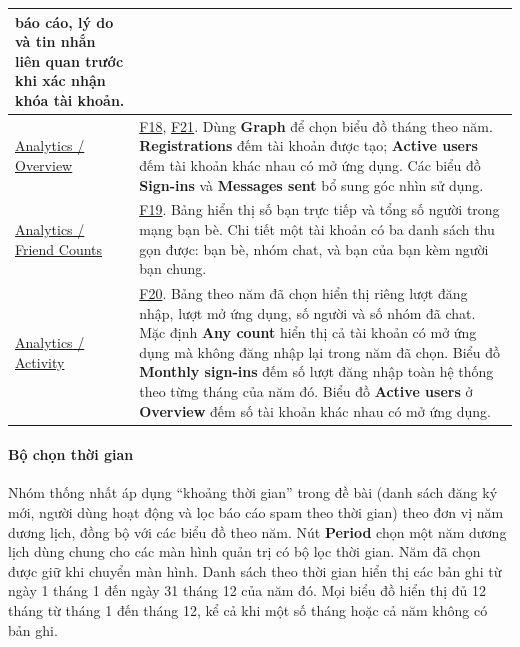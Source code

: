 \begin{longtable}{|L{4.3cm}|L{\dimexpr\textwidth-4.3cm-4\arrayrulewidth\relax}|}
  báo cáo, lý do và tin nhắn liên quan trước khi xác nhận khóa tài khoản.\\
  \hline
  \href{https://www.figma.com/design/maCogjZs9eOOhfkxsOZoIU?node-id=53-934}{Analytics / Overview}
  & \hyperlink{F18}{F18}, \hyperlink{F21}{F21}. Dùng \textbf{Graph} để chọn
  biểu đồ tháng theo năm. \textbf{Registrations} đếm tài khoản được tạo;
  \textbf{Active users} đếm tài khoản khác nhau có mở ứng dụng. Các biểu đồ
  \textbf{Sign-ins} và \textbf{Messages sent} bổ sung góc nhìn sử dụng.\\
  \hline
  \href{https://www.figma.com/design/maCogjZs9eOOhfkxsOZoIU?node-id=53-1087}{Analytics / Friend Counts}
  & \hyperlink{F19}{F19}. Bảng hiển thị số bạn trực tiếp và tổng số người
  trong mạng bạn bè. Chi tiết một tài khoản có ba danh sách thu gọn được:
  bạn bè, nhóm chat, và bạn của bạn kèm người bạn chung.\\
  \hline
  \href{https://www.figma.com/design/maCogjZs9eOOhfkxsOZoIU?node-id=53-1279}{Analytics / Activity}
  & \hyperlink{F20}{F20}. Bảng theo năm đã chọn hiển thị riêng lượt
  đăng nhập, lượt mở ứng dụng, số người và số nhóm đã chat. Mặc định
  \textbf{Any count} hiển thị cả tài khoản có mở ứng dụng mà không đăng nhập lại
  trong năm đã chọn. Biểu đồ \textbf{Monthly sign-ins} đếm số lượt đăng nhập
  toàn hệ thống theo từng tháng của năm đó. Biểu đồ \textbf{Active users} ở \textbf{Overview} đếm số tài khoản
  khác nhau có mở ứng dụng.\\
  \hline
\end{longtable}
\endgroup

\paragraph{Bộ chọn thời gian}
\mbox{}\par
Nhóm thống nhất áp dụng ``khoảng thời gian'' trong đề bài (danh sách đăng ký mới,
người dùng hoạt động và lọc báo cáo spam theo thời gian) theo đơn vị năm dương lịch,
đồng bộ với các biểu đồ theo năm.
Nút \textbf{Period} chọn một năm dương lịch dùng chung cho các màn hình
quản trị có bộ lọc thời gian. Năm đã chọn được giữ khi chuyển màn hình.
Danh sách theo thời gian hiển thị các bản ghi từ ngày 1 tháng 1 đến ngày 31
tháng 12 của năm đó. Mọi biểu đồ hiển thị đủ 12 tháng từ tháng 1 đến tháng 12,
kể cả khi một số tháng hoặc cả năm không có bản ghi.

